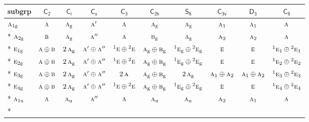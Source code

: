 \documentclass[10pt,a4paper]{article}
\numberwithin{equation}{section}
\newcommand{\grp}[1]{\mathsf{#1}}
\newcommand{\irr}[1]{\text{\normalfont\scshape #1}}
\newcommand{\conjpair}[1]{{}^{#1}}
\newcommand{\ptag}[1]{\mathrm{#1}}
\begin{document}
{\small\begin{longtable}{@{}lccccccccc@{}}\toprule
subgrp & \href{C2.pdf}{$\grp{C_{2}}$} & \href{S2.pdf}{$\grp{C_{i}}$} & \href{C1v.pdf}{$\grp{C_{s}}$} & \href{C3.pdf}{$\grp{C_{3}}$} & \href{C2h.pdf}{$\grp{C_{2h}}$} & \href{S6.pdf}{$\grp{S_{6}}$} & \href{C3v.pdf}{$\grp{C_{3v}}$} & \href{D3.pdf}{$\grp{D_{3}}$} & \href{C9.pdf}{$\grp{C_{9}}$}\\\midrule\endhead
\bottomrule\endfoot\endlastfoot
$\irr{a}_{1\ptag{g}}$ & $\irr{a}$ & $\irr{a}_{\ptag{g}}$ & $\irr{a}'$ & $\irr{a}$ & $\irr{a}_{\ptag{g}}$ & $\irr{a}_{\ptag{g}}$ & $\irr{a}_{1}$ & $\irr{a}_{1}$ & $\irr{a}$\\*
$\irr{a}_{2\ptag{g}}$ & $\irr{b}$ & $\irr{a}_{\ptag{g}}$ & $\irr{a}''$ & $\irr{a}$ & $\irr{b}_{\ptag{g}}$ & $\irr{a}_{\ptag{g}}$ & $\irr{a}_{2}$ & $\irr{a}_{2}$ & $\irr{a}$\\*
$\irr{e}_{1\ptag{g}}$ & $\irr{a}\oplus \irr{b}$ & $2\,\irr{a}_{\ptag{g}}$ & $\irr{a}'\oplus \irr{a}''$ & $\conjpair{1}\irr{e}\oplus \conjpair{2}\irr{e}$ & $\irr{a}_{\ptag{g}}\oplus \irr{b}_{\ptag{g}}$ & $\conjpair{1}\irr{e}_{\ptag{g}}\oplus \conjpair{2}\irr{e}_{\ptag{g}}$ & $\irr{e}$ & $\irr{e}$ & $\conjpair{1}\irr{e}_{1}\oplus \conjpair{2}\irr{e}_{1}$\\*
$\irr{e}_{2\ptag{g}}$ & $\irr{a}\oplus \irr{b}$ & $2\,\irr{a}_{\ptag{g}}$ & $\irr{a}'\oplus \irr{a}''$ & $\conjpair{1}\irr{e}\oplus \conjpair{2}\irr{e}$ & $\irr{a}_{\ptag{g}}\oplus \irr{b}_{\ptag{g}}$ & $\conjpair{1}\irr{e}_{\ptag{g}}\oplus \conjpair{2}\irr{e}_{\ptag{g}}$ & $\irr{e}$ & $\irr{e}$ & $\conjpair{1}\irr{e}_{2}\oplus \conjpair{2}\irr{e}_{2}$\\*
$\irr{e}_{3\ptag{g}}$ & $\irr{a}\oplus \irr{b}$ & $2\,\irr{a}_{\ptag{g}}$ & $\irr{a}'\oplus \irr{a}''$ & $2\,\irr{a}$ & $\irr{a}_{\ptag{g}}\oplus \irr{b}_{\ptag{g}}$ & $2\,\irr{a}_{\ptag{g}}$ & $\irr{a}_{1}\oplus \irr{a}_{2}$ & $\irr{a}_{1}\oplus \irr{a}_{2}$ & $\conjpair{1}\irr{e}_{3}\oplus \conjpair{2}\irr{e}_{3}$\\*
$\irr{e}_{4\ptag{g}}$ & $\irr{a}\oplus \irr{b}$ & $2\,\irr{a}_{\ptag{g}}$ & $\irr{a}'\oplus \irr{a}''$ & $\conjpair{1}\irr{e}\oplus \conjpair{2}\irr{e}$ & $\irr{a}_{\ptag{g}}\oplus \irr{b}_{\ptag{g}}$ & $\conjpair{1}\irr{e}_{\ptag{g}}\oplus \conjpair{2}\irr{e}_{\ptag{g}}$ & $\irr{e}$ & $\irr{e}$ & $\conjpair{1}\irr{e}_{4}\oplus \conjpair{2}\irr{e}_{4}$\\*
$\irr{a}_{1\ptag{u}}$ & $\irr{a}$ & $\irr{a}_{\ptag{u}}$ & $\irr{a}''$ & $\irr{a}$ & $\irr{a}_{\ptag{u}}$ & $\irr{a}_{\ptag{u}}$ & $\irr{a}_{2}$ & $\irr{a}_{1}$ & $\irr{a}$\\*

\end{longtable}}
\end{document}
